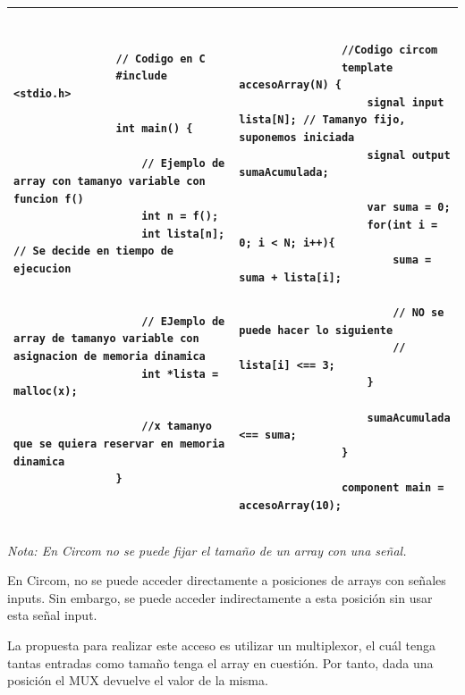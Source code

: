 \documentclass[a4paper,10pt]{article}
\begin{document}
		\begin{tabular}{p{} | p{}}
			\hline
			\lstset{language=C}
			\begin{lstlisting}
				// Codigo en C
				#include <stdio.h>
				
				int main() {
					
					// Ejemplo de array con tamanyo variable con funcion f() 
					int n = f();
					int lista[n]; // Se decide en tiempo de ejecucion
					
					
					// EJemplo de array de tamanyo variable con asignacion de memoria dinamica
					int *lista = malloc(x);
					
					//x tamanyo que se quiera reservar en memoria dinamica
				}
			\end{lstlisting} 
			
			&
			
			\begin{lstlisting}[language=Circom]
				
				//Codigo circom
				template accesoArray(N) {
					signal input lista[N]; // Tamanyo fijo, suponemos iniciada
					signal output sumaAcumulada;
					
					var suma = 0;
					for(int i = 0; i < N; i++){
						suma = suma + lista[i];
						
						// NO se puede hacer lo siguiente
						// lista[i] <== 3;
					}
					
					sumaAcumulada <== suma;
				}
				
				component main = accesoArray(10);
			\end{lstlisting}
			\\
			\hline
		\end{tabular}
	
		\vspace{0.4cm}
		
		\noindent \textit{Nota: En Circom no se puede fijar el tamaño de un array con una señal.}
		
		\vspace{2.6cm}
		
		\noindent En Circom, no se puede acceder directamente a posiciones de arrays con señales inputs. Sin embargo, se puede acceder indirectamente a esta posición sin usar esta señal input. 
		
		\vspace{0.3cm}
		
		\noindent La propuesta para realizar este acceso es utilizar un multiplexor, el cuál tenga tantas entradas como tamaño tenga el array en cuestión. Por tanto, dada una posición el MUX devuelve el valor de la misma.
		
\end{document}
